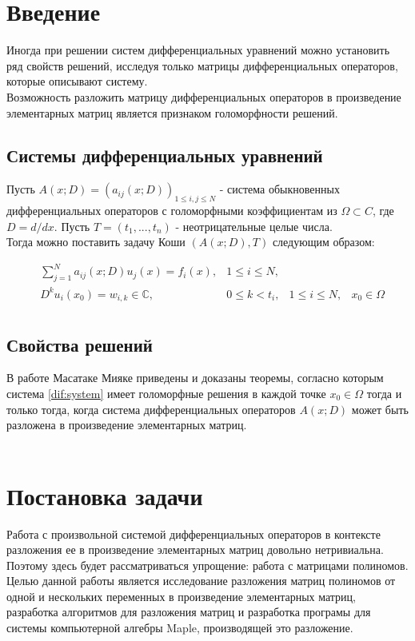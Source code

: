 \documentclass[14pt, a4paper]{extreport}
\begin{document}
\chapter{Введение}
	Иногда при решении систем дифференциальных уравнений можно установить ряд
	свойств решений, исследуя только матрицы дифференциальных операторов,
	которые описывают систему.
	\\
	Возможность разложить матрицу дифференциальных операторов в произведение
	элементарных матриц является \cite{miyake} признаком голоморфности решений.

	\section{Системы дифференциальных уравнений}
	Пусть $A(x;D) = (a_{ij}(x;D))_{1 \leq i, j \leq N}$ - система обыкновенных
	дифференциальных операторов с голоморфными коэффициентам из $\Omega \subset C$,
	где $D = d/dx$. Пусть $T = (t_1,...,t_n)$ - неотрицательные целые числа. \\
	Тогда можно поставить задачу Коши $(A(x;D), T)$ следующим образом:

	\begin{equation}
	\label{dif:system}
	\begin{aligned}
		& \sum\limits_{j=1}^N a_{ij}(x;D)u_j(x) = f_i(x), & 1 \leq i \leq N,\\
		& D^ku_i(x_0) = w_{i, k} \in \mathbb{C}, & 0 \leq k < t_i,  & 1 \leq i \leq N, & x_0 \in \Omega\\
	\end{aligned}
	\end{equation}

	\section{Свойства решений}
	В работе \cite{miyake} Масатаке Мияке приведены и доказаны теоремы, согласно которым система \ref{dif:system}
	имеет голоморфные решения в каждой точке $x_0 \in \Omega$ тогда и только тогда,
	когда система дифференциальных операторов $A(x;D)$ может быть разложена
	в произведение элементарных матриц. \\\\

\chapter{Постановка задачи}
	Работа с произвольной системой дифференциальных операторов в контексте разложения ее
	в произведение элементарных матриц довольно нетривиальна. Поэтому здесь будет
	рассматриваться упрощение: работа с матрицами полиномов.\\
	Целью данной работы является исследование разложения матриц полиномов от одной и нескольких
	переменных в произведение элементарных матриц, разработка алгоритмов для разложения матриц и
	разработка програмы для системы компьютерной алгебры Maple, производящей это разложение.
\end{document}
